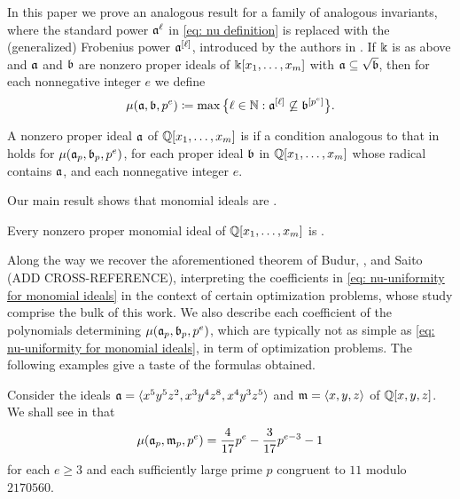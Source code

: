 \documentclass{amsart}
\begin{document}
In this paper we prove an analogous result for a family of analogous invariants, where the standard power $\mathfrak{a}^\ell$ in \eqref{eq: nu definition} is replaced with the (generalized) Frobenius power $\mathfrak{a}^{[\ell]}$, introduced by the authors in \cite{hernandez+etal.frobenius_powers}.
If $\Bbbk$ is as above and $\mathfrak{a}$ and $\mathfrak{b}$ are nonzero proper ideals of $\Bbbk[x_1, \ldots, x_m]$ with $\mathfrak{a} \subseteq \sqrt{\mathfrak{b}}$, then for each nonnegative integer $e$ we define
\[\mu(\mathfrak{a},\mathfrak{b},p^e) \coloneqq \max\big\{\ell\in \mathbb{N} : \mathfrak{a}^{[\ell]} \not\subseteq \mathfrak{b}^{[p^e]}\big\}.\]

\begin{definition}
   \label{defn: muCool}
   A nonzero proper ideal $\mathfrak{a}$ of $\mathbb{Q}[x_1,\ldots,x_m]$ is \emph{\muCool} if a condition analogous to that in  holds for $\mu(\mathfrak{a}_p,\mathfrak{b}_p,p^e)$, for each proper ideal $\mathfrak{b}$ in $\mathbb{Q}[x_1,\ldots,x_m]$ whose radical contains $\mathfrak{a}$, and each nonnegative integer $e$.
\end{definition}

Our main result shows that monomial ideals are \muCool.
\begin{thmintro}[\textcolor{nicered}{ADD CROSS-REFERENCE}]
   \label{main theorem}
   Every nonzero proper monomial ideal of $\mathbb{Q}[x_1,\ldots,x_m]$ is \muCool.
\end{thmintro}

Along the way we recover the aforementioned theorem of Budur, \mustata, and Saito \textcolor{nicered}{(ADD CROSS-REFERENCE)}, interpreting the coefficients in \eqref{eq: nu-uniformity for monomial ideals} in the context of certain optimization problems, whose study comprise the bulk of this work. 
We also describe each coefficient of the polynomials determining $\mu(\mathfrak{a}_p,\mathfrak{b}_p,p^e)$, which are typically not as simple as \eqref{eq: nu-uniformity for monomial ideals}, in term of optimization problems.
The following examples give a taste of the formulas obtained.

\begin{example}
   \label{ex1 intro}
   Consider the ideals $\mathfrak{a} = \langle x^5 y^5 z^2, x^3 y^4 z^8, x^4 y^3 z^5 \rangle$ and $\mathfrak{m} = \langle x,y,z \rangle$ of $\mathbb{Q}[x,y,z]$.
   We shall see in  that
   \[
      \mu(\mathfrak{a}_p,\mathfrak{m}_p,p^e) = \frac{4}{17}p^e - \frac{3}{17}p^{e-3}  - 1
    \]
    for each $e\ge 3$ and each sufficiently large prime $p$ congruent to $11$ modulo $2170560$.
\end{example}
\end{document}
